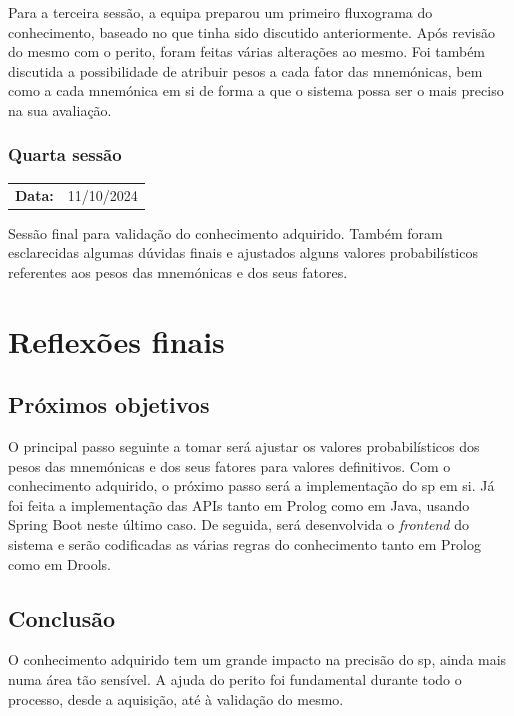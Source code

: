 \documentclass[a4paper,12pt,twoside]{article}
\begin{document}
    Para a terceira sessão, a equipa preparou um primeiro fluxograma do conhecimento, baseado no que tinha sido discutido anteriormente. Após revisão do mesmo com o perito, foram feitas várias alterações ao mesmo. Foi também discutida a possibilidade de atribuir pesos a cada fator das mnemónicas, bem como a cada mnemónica em si de forma a que o sistema possa ser o mais preciso na sua avaliação.

    \subsubsection{Quarta sessão}
    \begin{tabularx}{0.5\textwidth}{@{}lX@{}}
        \textbf{Data:} & 11/10/2024 \\
    \end{tabularx}

    Sessão final para validação do conhecimento adquirido. Também foram esclarecidas algumas dúvidas finais e ajustados alguns valores probabilísticos referentes aos pesos das mnemónicas e dos seus fatores.

    \newpage


    \section{Reflexões finais}
    \subsection{Próximos objetivos}
    O principal passo seguinte a tomar será ajustar os valores probabilísticos dos pesos das mnemónicas e dos seus fatores para valores definitivos.
    Com o conhecimento adquirido, o próximo passo será a implementação do \gls{sp} em si. Já foi feita a implementação das \glspl{API} tanto em Prolog como em Java, usando Spring Boot neste último caso. De seguida, será desenvolvida o \textit{frontend} do sistema e serão codificadas as várias regras do conhecimento tanto em Prolog como em Drools.
    \subsection{Conclusão}
    O conhecimento adquirido tem um grande impacto na precisão do \gls{sp}, ainda mais numa área tão sensível. A ajuda do perito foi fundamental durante todo o processo, desde a aquisição, até à validação do mesmo.

    \newpage

    \printglossary

    \newpage

    \nocite{*}
    \printbibliography
\end{document}
